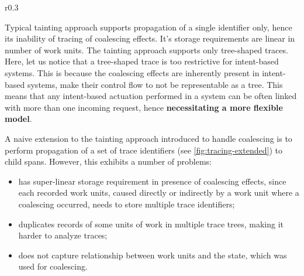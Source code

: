 \begin{wrapfigure}{r}{0.3\textwidth}
\caption{Naive extension of the tainting model in presence of coalescing effect}
\label{fig:tracing-extended}
\end{wrapfigure}

Typical tainting approach supports propagation of a single identifier only, hence its inability of tracing of coalescing effects. It's storage requirements are linear in number of work units. The tainting approach supports only tree-shaped traces. Here, let us notice that a tree-shaped trace is too restrictive for intent-based systems. This is because the coalescing effects are inherently present in intent-based systems, make their control flow to not be representable as a tree. This means that any intent-based actuation performed in a system can be often linked with more than one incoming request, hence \textbf{necessitating a more flexible model}.

A naive extension to the tainting approach introduced to handle coalescing is to perform propagation of a set of trace identifiers (see \cref{fig:tracing-extended}) to child spans. However, this exhibits a number of problems:
%
\begin{itemize}
    \item has super-linear storage requirement in presence of coalescing effects, since each recorded work units, caused directly or indirectly by a work unit where a coalescing occurred, needs to store multiple trace identifiers;
    \item duplicates records of some units of work in multiple trace trees, making it harder to analyze traces;
    \item does not capture relationship between work units and the state, which was used for coalescing.
\end{itemize}

